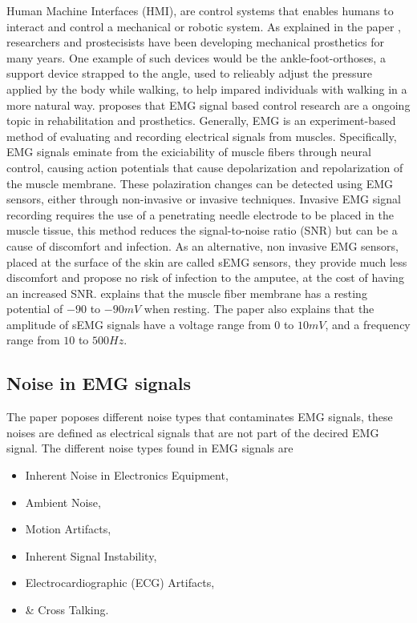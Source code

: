 \documentclass[../main.tex]{subfiles}
\begin{document}
Human Machine Interfaces (HMI), are control systems that enables humans to interact and control a mechanical or robotic system.
As explained in the paper \cite{Tech2015}, researchers and prostecisists have been developing mechanical prosthetics for many years.
One example of such devices would be the ankle-foot-orthoses, a support device strapped to the angle, used to relieably adjust the pressure applied by the body while walking, to help impared individuals with walking in a more natural way.
\cite{Tech2015} proposes that EMG signal based control research are a ongoing topic in rehabilitation and prosthetics.
Generally, EMG is an experiment-based method of evaluating and recording electrical signals from muscles.
Specifically, EMG signals eminate from the exiciability of muscle fibers through neural control, causing action potentials that cause depolarization and repolarization of the muscle membrane.
These polaziration changes can be detected using EMG sensors, either through non-invasive or invasive techniques.
Invasive EMG signal recording requires the use of a penetrating needle electrode to be placed in the muscle tissue, this method reduces the signal-to-noise ratio (SNR) but can be a cause of discomfort and infection.
As an alternative, non invasive EMG sensors, placed at the surface of the skin are called sEMG sensors, they provide much less discomfort and propose no risk of infection to the amputee, at the cost of having an increased SNR. 
\cite{Tech2015} explains that the muscle fiber membrane has a resting potential of $-90$ to $-90 mV$ when resting. The paper also explains that the amplitude of sEMG signals have a voltage range from $0$ to $10 mV$, and a frequency range from $10$ to $500 Hz$.

\subsection{Noise in EMG signals}

The paper \cite{Tech2015} poposes different noise types that contaminates EMG signals, these noises are defined as electrical signals that are not part of the decired EMG signal.
The different noise types found in EMG signals are
\begin{itemize}
\item Inherent Noise in Electronics Equipment,
\item Ambient Noise,
\item Motion Artifacts,
\item Inherent Signal Instability,
\item Electrocardiographic (ECG) Artifacts,
\item \& Cross Talking.
\end{itemize}
\end{document}
